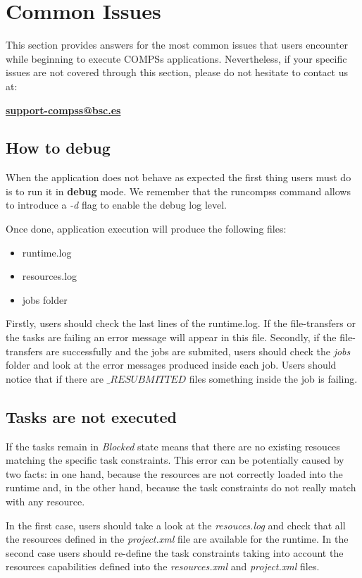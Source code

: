 \section{Common Issues}
\label{sec:Common_Issues}

This section provides answers for the most common issues that users encounter while beginning to execute COMPSs applications.
Nevertheless, if your specific issues are not covered through this section, please do not hesitate to contact us at:
\begin{center}
  \textbf{\url{support-compss@bsc.es}}
\end{center}

\subsection{How to debug}
When the application does not behave as expected the first thing users must do is to run it in \textbf{debug} mode. We remember that
the runcompss command allows to introduce a \textit{-d} flag to enable the debug log level.

Once done, application execution will produce the following files:
\begin{itemize}
 \item runtime.log
 \item resources.log
 \item jobs folder
\end{itemize}

Firstly, users should check the last lines of the runtime.log. If the file-transfers or the tasks are failing an error message 
will appear in this file. 
Secondly, if the file-transfers are successfully and the jobs are submited, users should check the \textit{jobs} folder and look 
at the error messages produced inside each job. Users should notice that if there are $\_RESUBMITTED$ files something 
inside the job is failing.

\subsection{Tasks are not executed}
If the tasks remain in \textit{Blocked} state means that there are no existing resouces matching the specific task constraints. 
This error can be potentially caused by two facts: in one hand, because the resources are not correctly loaded into the runtime
and, in the other hand, because the task constraints do not really match with any resource. 

In the first case, users should take a look at the \textit{resouces.log} and check that all the resources
defined in the \textit{project.xml} file are available for the runtime. In the second case users should re-define the task 
constraints taking into account the resources capabilities defined into the \textit{resources.xml} and \textit{project.xml} files.

